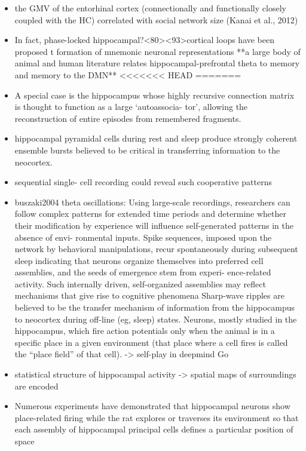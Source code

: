 \documentclass{article} %
\begin{document}
\begin{itemize}
\begin{itemize}
\item
the GMV of the entorhinal cortex (connectionally and functionally closely coupled with the HC) correlated with social network size (Kanai et al., 2012)


\item 
In fact, phase-locked hippocampal?<80><93>cortical loops have been proposed t
formation of mnemonic neuronal representations
**a large body of animal and human literature relates
hippocampal-prefrontal theta to memory and memory to the DMN**
<<<<<<< HEAD
=======

\item 
A special case is the hippocampus whose highly recursive connection matrix is thought to function as a large ‘autoassocia- tor’, allowing the reconstruction of entire episodes from remembered fragments.

\item
hippocampal pyramidal cells during rest and sleep produce strongly coherent ensemble bursts believed to be critical in transferring information to the neocortex.

\item
sequential single- cell recording could reveal such cooperative patterns

\item
buszaki2004 theta oscillations:
Using large-scale recordings, researchers can follow complex patterns for extended time periods and determine whether their modification by experience will influence self-generated patterns in the absence of envi- ronmental inputs. Spike sequences, imposed upon the network by behavioral manipulations, recur spontaneously during subsequent sleep
indicating that neurons organize themselves into preferred cell assemblies, and the seeds of emergence stem from experi- ence-related activity.
 Such internally driven, self-organized assemblies may reflect mechanisms that give rise to cognitive phenomena
 Sharp-wave ripples are believed to be the transfer mechanism of information from the hippocampus to neocortex during off-line (eg, sleep) states.
Neurons, mostly studied in the hippocampus, which fire action potentials only when the animal is in a specific place in a given environment (that place where a cell fires is called the “place field” of that cell).
-> self-play in deepmind Go

\item
statistical structure of hippocampal activity ->
spatial maps of surroundings are encoded

\item
Numerous experiments have demonstrated that hippocampal neurons show place-related firing while the rat explores or traverses its environment so that each assembly of hippocampal principal cells defines a particular position of space 


\end{itemize}
\end{itemize}
\end{document}
